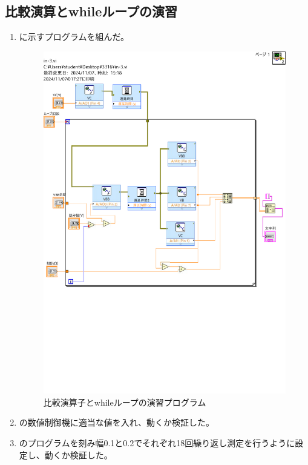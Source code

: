 \documentclass[11pt,dvipdfmx]{jarticle}
\begin{document}
	\subsection{比較演算とwhileループの演習}
			\begin{enumerate}
				\item {}に示すプログラムを組んだ。
				\begin{figure}[H]
					\centering
					\includegraphics[scale=0.3]{fig/in-3.pdf}
					\caption{比較演算子とwhileループの演習プログラム}
					\label{fig:比較演算子とwhileループの演習プログラム}
				\end{figure}
				\item {}の数値制御機に適当な値を入れ、動くか検証した。
				\item {}のプログラムを刻み幅0.1と0.2でそれぞれ18回繰り返し測定を行うように設定し、動くか検証した。
			\end{enumerate}
\end{document}
